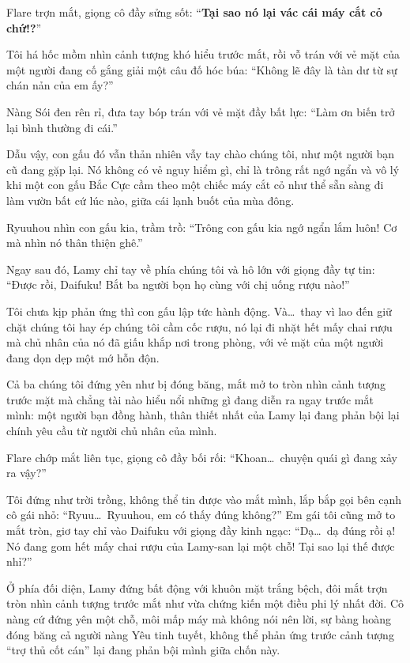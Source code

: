 \documentclass[../main.tex]{subfiles}
\begin{document}

Flare trợn mắt, giọng cô đầy sửng sốt: ``\textbf{Tại sao nó lại vác cái máy cắt cỏ chứ!?}''

Tôi há hốc mồm nhìn cảnh tượng khó hiểu trước mắt, rồi vỗ trán với vẻ mặt của một người đang cố gắng giải một câu đố hóc búa: ``Không lẽ đây là tàn dư từ sự chán nản của em ấy?''

Nàng Sói đen rên rỉ, đưa tay bóp trán với vẻ mặt đầy bất lực: ``Làm ơn biến trở lại bình thường đi cái.''

Dẫu vậy, con gấu đó vẫn thản nhiên vẫy tay chào chúng tôi, như một người bạn cũ đang gặp lại. Nó không có vẻ nguy hiểm gì, chỉ là trông rất ngớ ngẩn và vô lý khi một con gấu Bắc Cực cầm theo một chiếc máy cắt cỏ như thể sẵn sàng đi làm vườn bất cứ lúc nào, giữa cái lạnh buốt của mùa đông.

Ryuuhou nhìn con gấu kia, trầm trồ: ``Trông con gấu kia ngớ ngẩn lắm luôn! Cơ mà nhìn nó thân thiện ghê.''

Ngay sau đó, Lamy chỉ tay về phía chúng tôi và hô lớn với giọng đầy tự tin: ``Được rồi, Daifuku! Bắt ba người bọn họ cùng với chị uống rượu nào!''

Tôi chưa kịp phản ứng thì con gấu lập tức hành động. Và\dots\ thay vì lao đến giữ chặt chúng tôi hay ép chúng tôi cầm cốc rượu, nó lại đi nhặt hết mấy chai rượu mà chủ nhân của nó đã giấu khắp nơi trong phòng, với vẻ mặt của một người đang dọn dẹp một mớ hỗn độn.

Cả ba chúng tôi đứng yên như bị đóng băng, mắt mở to tròn nhìn cảnh tượng trước mặt mà chẳng tài nào hiểu nổi những gì đang diễn ra ngay trước mắt mình: một người bạn đồng hành, thân thiết nhất của Lamy lại đang phản bội lại chính yêu cầu từ người chủ nhân của mình.

Flare chớp mắt liên tục, giọng cô đầy bối rối: ``Khoan\dots\ chuyện quái gì đang xảy ra vậy?''

Tôi đứng như trời trồng, không thể tin được vào mắt mình, lắp bắp gọi bên cạnh cô gái nhỏ: ``Ryuu\dots\ Ryuuhou, em có thấy đúng không?'' Em gái tôi cũng mở to mắt tròn, giơ tay chỉ vào Daifuku với giọng đầy kinh ngạc: ``Dạ\dots\ dạ đúng rồi ạ! Nó đang gom hết mấy chai rượu của Lamy-san lại một chỗ! Tại sao lại thế được nhỉ?''

Ở phía đối diện, Lamy đứng bất động với khuôn mặt trắng bệch, đôi mắt trợn tròn nhìn cảnh tượng trước mắt như vừa chứng kiến một điều phi lý nhất đời. Cô nàng cứ đứng yên một chỗ, môi mấp máy mà không nói nên lời, sự bàng hoàng đóng băng cả người nàng Yêu tinh tuyết, không thể phản ứng trước cảnh tượng ``trợ thủ cốt cán'' lại đang phản bội mình giữa chốn này.
\end{document}
